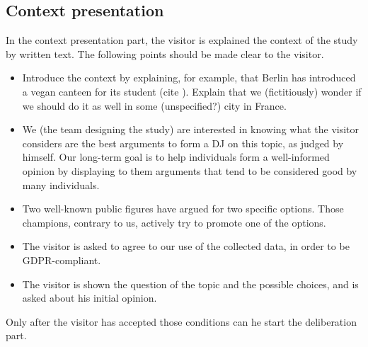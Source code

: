 \documentclass[version=3.21, pagesize, twoside=off, bibliography=totoc, DIV=calc, fontsize=12pt, a4paper]{scrartcl}
\begin{document}
\subsection{Context presentation}
In the context presentation part, the visitor is explained the context of the study by written text. The following points should be made clear to the visitor.
\begin{itemize}
	\item Introduce the context by explaining, for example, that Berlin has introduced a vegan canteen for its student (cite ). Explain that we (fictitiously) wonder if we should do it as well in some (unspecified?) city in France.
	\item We (the team designing the study) are interested in knowing what the visitor considers are the best arguments to form a \ac{DJ} on this topic, as judged by himself. Our long-term goal is to help individuals form a well-informed opinion by displaying to them arguments that tend to be considered good by many individuals.
	\item Two well-known public figures have argued for two specific options. Those champions, contrary to us, actively try to promote one of the options.
	\item The visitor is asked to agree to our use of the collected data, in order to be GDPR-compliant.
	\item The visitor is shown the question of the topic and the possible choices, and is asked about his initial opinion.
\end{itemize}
Only after the visitor has accepted those conditions can he start the deliberation part. 
\end{document}

